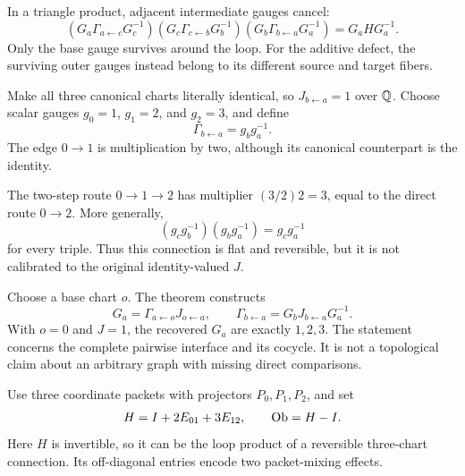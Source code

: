 In a triangle product, adjacent intermediate gauges cancel:
\[
(G_a\Gamma_{a\leftarrow c}G_c^{-1})
(G_c\Gamma_{c\leftarrow b}G_b^{-1})
(G_b\Gamma_{b\leftarrow a}G_a^{-1})
=G_aHG_a^{-1}.
\]
Only the base gauge survives around the loop. For the additive defect, the surviving outer gauges instead belong to its different source and target fibers.


Make all three canonical charts literally identical, so $J_{b\leftarrow a}=1$ over $\mathbb Q$. Choose scalar gauges $g_0=1$, $g_1=2$, and $g_2=3$, and define
\[
\Gamma_{b\leftarrow a}=g_b g_a^{-1}.
\]
The edge $0\to1$ is multiplication by two, although its canonical counterpart is the identity.


The two-step route $0\to1\to2$ has multiplier $(3/2)2=3$, equal to the direct route $0\to2$. More generally,
\[
(g_cg_b^{-1})(g_bg_a^{-1})=g_cg_a^{-1}
\]
for every triple. Thus this connection is flat and reversible, but it is not calibrated to the original identity-valued $J$.

Choose a base chart $o$. The theorem constructs
\[
G_a=\Gamma_{a\leftarrow o}J_{o\leftarrow a},
\qquad
\Gamma_{b\leftarrow a}=G_bJ_{b\leftarrow a}G_a^{-1}.
\]
With $o=0$ and $J=1$, the recovered $G_a$ are exactly $1,2,3$. The statement concerns the complete pairwise interface and its cocycle. It is not a topological claim about an arbitrary graph with missing direct comparisons.


Use three coordinate packets with projectors $P_0,P_1,P_2$, and set
\[
H=I+2E_{01}+3E_{12},\qquad \operatorname{Ob}=H-I.
\]
Here $H$ is invertible, so it can be the loop product of a reversible three-chart connection. Its off-diagonal entries encode two packet-mixing effects.


